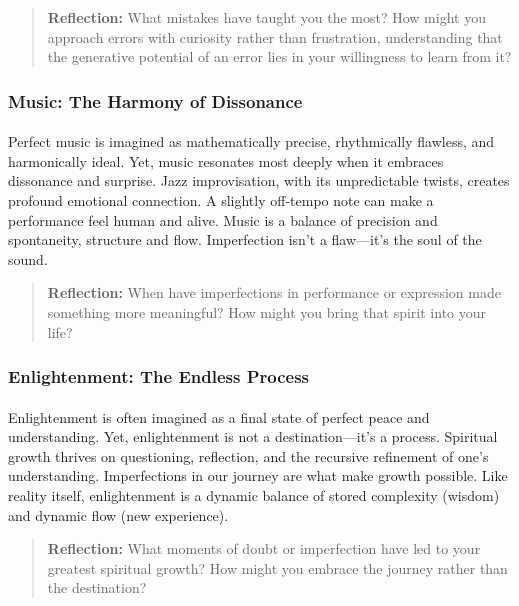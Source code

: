 \documentclass[12pt]{article}
\begin{document}
\begin{quote}
\textbf{Reflection:}
What mistakes have taught you the most? How might you approach errors with curiosity rather than frustration, understanding that the generative potential of an error lies in your willingness to learn from it?
\end{quote}

\subsubsection{Music: The Harmony of Dissonance}
\paragraph{}
Perfect music is imagined as mathematically precise, rhythmically flawless, and harmonically ideal. Yet, music resonates most deeply when it embraces dissonance and surprise. Jazz improvisation, with its unpredictable twists, creates profound emotional connection. A slightly off-tempo note can make a performance feel human and alive. Music is a balance of precision and spontaneity, structure and flow. Imperfection isn’t a flaw—it’s the soul of the sound.

\begin{quote}
\textbf{Reflection:}  
When have imperfections in performance or expression made something more meaningful? How might you bring that spirit into your life?
\end{quote}

\subsubsection{Enlightenment: The Endless Process}
\paragraph{}
Enlightenment is often imagined as a final state of perfect peace and understanding. Yet, enlightenment is not a destination—it’s a process. Spiritual growth thrives on questioning, reflection, and the recursive refinement of one’s understanding. Imperfections in our journey are what make growth possible. Like reality itself, enlightenment is a dynamic balance of stored complexity (wisdom) and dynamic flow (new experience).

\begin{quote}
\textbf{Reflection:}  
What moments of doubt or imperfection have led to your greatest spiritual growth? How might you embrace the journey rather than the destination?
\end{quote}
\end{document}
